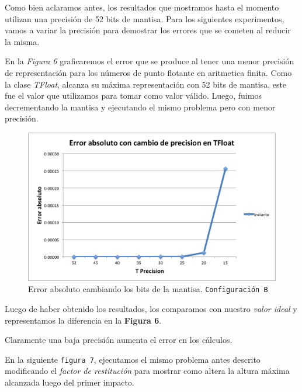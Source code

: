 \documentclass[a4paper]{article}
\begin{document}
Como bien aclaramos antes, los resultados que mostramos hasta el momento utilizan una precisión de 52 bits de mantisa. Para los siguientes experimentos, vamos a variar la precisión para demostrar los errores que se cometen al reducir la misma.



En la \textit{Figura 6} graficaremos el error que se produce al tener una menor precisión de representación para los números de punto flotante en aritmetica finita. 
Como la clase \textit{TFloat}, alcanza su máxima representación con 52 bits de mantisa, este fue el valor que utilizamos para tomar como valor válido. Luego, fuimos decrementando la mantisa y ejecutando el mismo problema pero con menor precisión. \\[1em]

\begin{figure}[H]
  \centering
  \includegraphics[scale=0.75]{graficos/6-errorAbsoluto.png}
  \caption{Error absoluto cambiando los bits de la mantisa. \texttt{Configuración B} }
\end{figure}

Luego de haber obtenido los resultados, los comparamos con nuestro \textit{valor ideal} y representamos la diferencia en la \textbf{Figura 6}.

Claramente una baja precisión aumenta el error en los cálculos.


En la siguiente \texttt{figura 7}, ejecutamos el mismo problema antes descrito modificando el \textit{factor de restitución} para mostrar como altera la altura máxima alcanzada luego del primer impacto.
\end{document}

